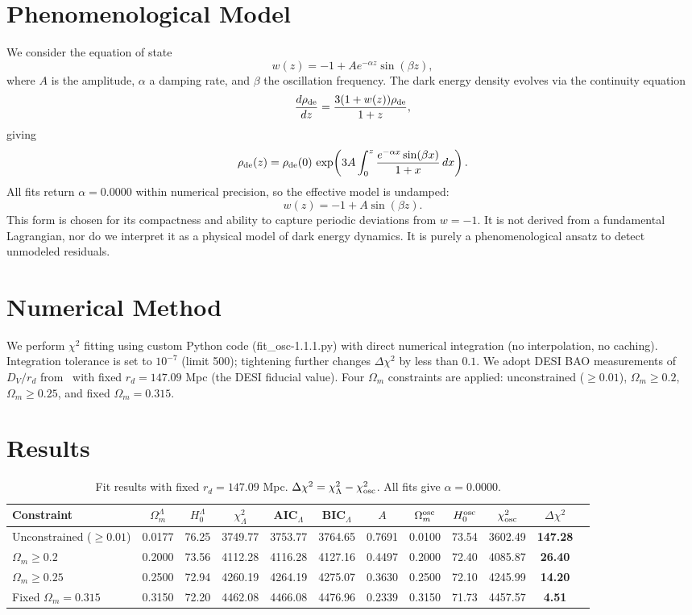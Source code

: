 \documentclass[10pt,a4paper,twocolumn]{article}
\begin{document}
\section{Phenomenological Model}
We consider the equation of state
\[
w(z) = -1 + A e^{-\alpha z}\sin(\beta z),
\]
where $A$ is the amplitude, $\alpha$ a damping rate, and $\beta$ the oscillation frequency. The dark energy density evolves via the continuity equation
\[
\frac{d\rho_{\rm de}}{dz} = \frac{3(1+w(z))\rho_{\rm de}}{1+z},
\]
giving
\[
\rho_{\rm de}(z) = \rho_{\rm de}(0)\,\exp\!\left(3A\int_0^z \frac{e^{-\alpha x}\sin(\beta x)}{1+x}\,dx\right).
\]
All fits return $\alpha=0.0000$ within numerical precision, so the effective model is undamped:
\[
w(z) = -1 + A\sin(\beta z).
\]
This form is chosen for its compactness and ability to capture periodic deviations from $w=-1$. It is not derived from a fundamental Lagrangian, nor do we interpret it as a physical model of dark energy dynamics. It is purely a phenomenological ansatz to detect unmodeled residuals.

\section{Numerical Method}
We perform $\chi^2$ fitting using custom Python code (fit\_osc-1.1.1.py) with direct numerical integration (no interpolation, no caching). Integration tolerance is set to $10^{-7}$ (limit 500); tightening further changes $\Delta\chi^2$ by less than $0.1$. We adopt DESI BAO measurements of $D_V/r_d$ from~\cite{DESI2024} with fixed $r_d=147.09$ Mpc (the DESI fiducial value). Four $\Omega_m$ constraints are applied: unconstrained ($\ge0.01$), $\Omega_m\ge0.2$, $\Omega_m\ge0.25$, and fixed $\Omega_m=0.315$.

\section{Results}
\begin{table}[ht]
\centering
\caption{Fit results with fixed $r_d=147.09$ Mpc. $\Delta\chi^2 = \chi^2_{\Lambda} - \chi^2_{\rm osc}$. All fits give $\alpha=0.0000$.}
\label{tab:results}
\begin{tabular}{lcccccccccc>{\bfseries}c}
\toprule
Constraint & $\Omega_m^\Lambda$ & $H_0^\Lambda$ & $\chi^2_\Lambda$ & AIC$_\Lambda$ & BIC$_\Lambda$ & $A$ & $\Omega_m^{\rm osc}$ & $H_0^{\rm osc}$ & $\chi^2_{\rm osc}$ & $\Delta\chi^2$ \\
\midrule
Unconstrained ($\ge0.01$) & 0.0177 & 76.25 & 3749.77 & 3753.77 & 3764.65 & 0.7691 & 0.0100 & 73.54 & 3602.49 & \textbf{147.28} \\
$\Omega_m\ge0.2$         & 0.2000 & 73.56 & 4112.28 & 4116.28 & 4127.16 & 0.4497 & 0.2000 & 72.40 & 4085.87 & \textbf{26.40} \\
$\Omega_m\ge0.25$        & 0.2500 & 72.94 & 4260.19 & 4264.19 & 4275.07 & 0.3630 & 0.2500 & 72.10 & 4245.99 & \textbf{14.20} \\
Fixed $\Omega_m=0.315$   & 0.3150 & 72.20 & 4462.08 & 4466.08 & 4476.96 & 0.2339 & 0.3150 & 71.73 & 4457.57 & \textbf{4.51} \\
\bottomrule
\end{tabular}
\end{table}
\end{document}
